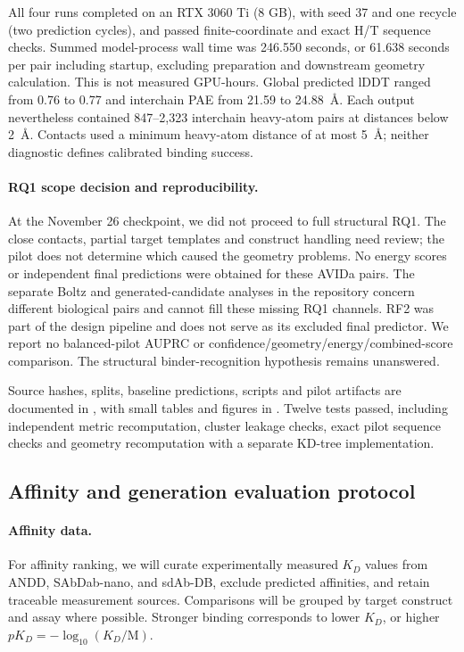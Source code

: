 \documentclass[11pt, logo, nonumbering]{preprint}
\begin{document}
All four runs completed on an RTX 3060 Ti (8 GB), with seed 37 and one recycle
(two prediction cycles), and passed finite-coordinate and exact H/T sequence
checks. Summed model-process wall time was 246.550 seconds, or 61.638 seconds
per pair including startup, excluding preparation and downstream geometry
calculation. This is not measured GPU-hours. Global predicted lDDT ranged from
0.76 to 0.77 and interchain PAE from 21.59 to 24.88~\AA. Each output nevertheless
contained 847--2,323 interchain heavy-atom pairs at distances below 2~\AA.
Contacts used a minimum heavy-atom distance of at most 5~\AA; neither diagnostic
defines calibrated binding success.

\paragraph{RQ1 scope decision and reproducibility.}
At the November 26 checkpoint, we did not proceed to full structural RQ1.
The close contacts, partial target templates and construct handling need review;
the pilot does not determine which caused the geometry problems. No energy
scores or independent final predictions were obtained for these AVIDa pairs.
The separate Boltz and generated-candidate analyses in the repository concern
different biological pairs and cannot fill these missing RQ1 channels. RF2 was
part of the design pipeline and does not serve as its excluded final predictor.
We report no balanced-pilot AUPRC or confidence/geometry/energy/combined-score
comparison. The structural binder-recognition hypothesis remains unanswered.

Source hashes, splits, baseline predictions, scripts and pilot artifacts are
documented in , with small tables and
figures in . Twelve tests passed, including independent
metric recomputation, cluster leakage checks, exact pilot sequence checks and
geometry recomputation with a separate KD-tree implementation.

\subsection{Affinity and generation evaluation protocol}

\paragraph{Affinity data.}
For affinity ranking, we will curate experimentally measured $K_D$ values from ANDD, SAbDab-nano, and sdAb-DB, exclude predicted affinities, and retain traceable measurement sources. Comparisons will be grouped by target construct and assay where possible. Stronger binding corresponds to lower $K_D$, or higher $pK_D = -\log_{10}(K_D/\mathrm{M})$.
\end{document}
